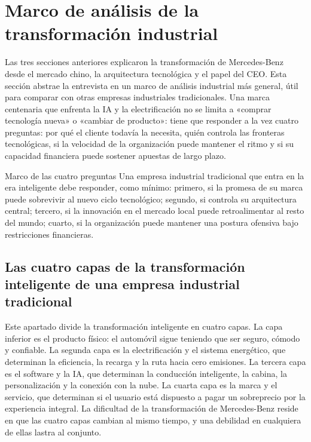 \section{Marco de análisis de la transformación industrial}

Las tres secciones anteriores explicaron la transformación de Mercedes-Benz desde el mercado chino, la arquitectura tecnológica y el papel del CEO. Esta sección abstrae la entrevista en un marco de análisis industrial más general, útil para comparar con otras empresas industriales tradicionales. Una marca centenaria que enfrenta la IA y la electrificación no se limita a «comprar tecnología nueva» o «cambiar de producto»: tiene que responder a la vez cuatro preguntas: por qué el cliente todavía la necesita, quién controla las fronteras tecnológicas, si la velocidad de la organización puede mantener el ritmo y si su capacidad financiera puede sostener apuestas de largo plazo.

\begin{importantbox}{Marco de las cuatro preguntas}
Una empresa industrial tradicional que entra en la era inteligente debe responder, como mínimo: primero, si la promesa de su marca puede sobrevivir al nuevo ciclo tecnológico; segundo, si controla su arquitectura central; tercero, si la innovación en el mercado local puede retroalimentar al resto del mundo; cuarto, si la organización puede mantener una postura ofensiva bajo restricciones financieras.
\end{importantbox}

\subsection{Las cuatro capas de la transformación inteligente de una empresa industrial tradicional}

Este apartado divide la transformación inteligente en cuatro capas. La capa inferior es el producto físico: el automóvil sigue teniendo que ser seguro, cómodo y confiable. La segunda capa es la electrificación y el sistema energético, que determinan la eficiencia, la recarga y la ruta hacia cero emisiones. La tercera capa es el software y la IA, que determinan la conducción inteligente, la cabina, la personalización y la conexión con la nube. La cuarta capa es la marca y el servicio, que determinan si el usuario está dispuesto a pagar un sobreprecio por la experiencia integral. La dificultad de la transformación de Mercedes-Benz reside en que las cuatro capas cambian al mismo tiempo, y una debilidad en cualquiera de ellas lastra al conjunto.

